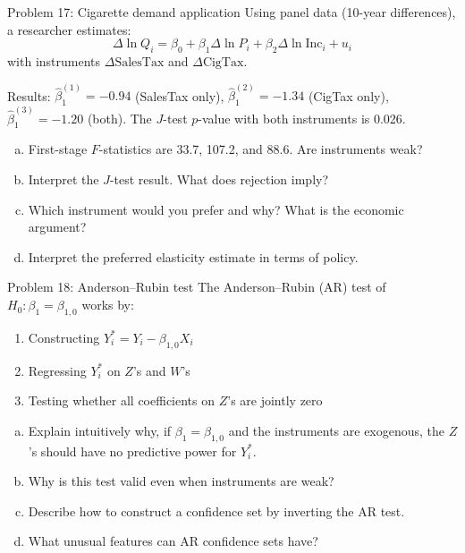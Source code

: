 \documentclass[10pt]{beamer}
\begin{document}
\begin{frame}{Problem 17: Cigarette demand application}
\label{q17}
Using panel data (10-year differences), a researcher estimates:
\[
\Delta\ln Q_i = \beta_0 + \beta_1 \Delta\ln P_i + \beta_2 \Delta\ln\text{Inc}_i + u_i
\]
with instruments $\Delta\text{SalesTax}$ and $\Delta\text{CigTax}$.

Results: $\widehat{\beta}_1^{(1)} = -0.94$ (SalesTax only), $\widehat{\beta}_1^{(2)} = -1.34$ (CigTax only), $\widehat{\beta}_1^{(3)} = -1.20$ (both). The $J$-test $p$-value with both instruments is 0.026.

\begin{enumerate}[(a)]
  \item First-stage $F$-statistics are 33.7, 107.2, and 88.6. Are instruments weak?
  \item Interpret the $J$-test result. What does rejection imply?
  \item Which instrument would you prefer and why? What is the economic argument?
  \item Interpret the preferred elasticity estimate in terms of policy.
\end{enumerate}

\vfill
\hfill\hyperlink{s17}{}
\end{frame}

\begin{frame}{Problem 18: Anderson--Rubin test}
\label{q18}
The Anderson--Rubin (AR) test of $H_0: \beta_1 = \beta_{1,0}$ works by:
\begin{enumerate}
  \item Constructing $Y_i^* = Y_i - \beta_{1,0}X_i$
  \item Regressing $Y_i^*$ on $Z$'s and $W$'s
  \item Testing whether all coefficients on $Z$'s are jointly zero
\end{enumerate}

\begin{enumerate}[(a)]
  \item Explain intuitively why, if $\beta_1 = \beta_{1,0}$ and the instruments are exogenous, the $Z$'s should have no predictive power for $Y_i^*$.
  \item Why is this test valid even when instruments are weak?
  \item Describe how to construct a confidence set by inverting the AR test.
  \item What unusual features can AR confidence sets have?
\end{enumerate}

\vfill
\hfill\hyperlink{s18}{}
\end{frame}
\end{document}
